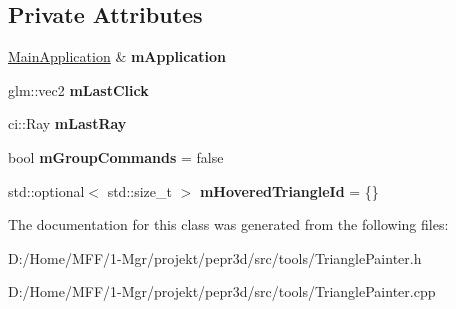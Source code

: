 \subsection*{Private Attributes}
\begin{DoxyCompactItemize}
\item 
\mbox{\label{classpepr3d_1_1_triangle_painter_a60d6d50cc1046ef380ddf04abd1e6f3e}} 
\mbox{\hyperlink{classpepr3d_1_1_main_application}{Main\+Application}} \& {\bfseries m\+Application}
\item 
\mbox{\label{classpepr3d_1_1_triangle_painter_a8f3689cb00111eff5f25876e5b5c8096}} 
glm\+::vec2 {\bfseries m\+Last\+Click}
\item 
\mbox{\label{classpepr3d_1_1_triangle_painter_a61bcf0a89c73279b23e605c8494fe7ec}} 
ci\+::\+Ray {\bfseries m\+Last\+Ray}
\item 
\mbox{\label{classpepr3d_1_1_triangle_painter_a75e4e0d40def32ec1cd612ad089fe2d8}} 
bool {\bfseries m\+Group\+Commands} = false
\item 
\mbox{\label{classpepr3d_1_1_triangle_painter_ac2f1a64760c713b39c4dcf1fea51c65e}} 
std\+::optional$<$ std\+::size\+\_\+t $>$ {\bfseries m\+Hovered\+Triangle\+Id} = \{\}
\end{DoxyCompactItemize}


The documentation for this class was generated from the following files\+:\begin{DoxyCompactItemize}
\item 
D\+:/\+Home/\+M\+F\+F/1-\/\+Mgr/projekt/pepr3d/src/tools/Triangle\+Painter.\+h\item 
D\+:/\+Home/\+M\+F\+F/1-\/\+Mgr/projekt/pepr3d/src/tools/Triangle\+Painter.\+cpp\end{DoxyCompactItemize}
